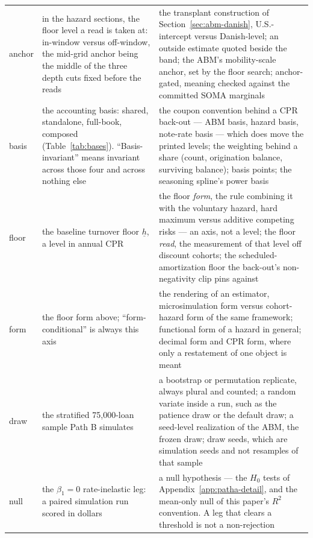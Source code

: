 \documentclass[12pt]{article}
\begin{document}
{\begin{longtable}{@{}p{1.5cm}p{6.2cm}p{6.2cm}@{}}
anchor & in the hazard sections, the floor level a read is taken at: in-window versus off-window, the mid-grid anchor being the middle of the three depth cuts fixed before the reads & the transplant construction of Section~\ref{sec:abm-danish}, U.S.-intercept versus Danish-level; an outside estimate quoted beside the band; the ABM's mobility-scale anchor, set by the floor search; anchor-gated, meaning checked against the committed SOMA marginals \\
basis & the accounting basis: shared, standalone, full-book, composed (Table~\ref{tab:bases}). ``Basis-invariant'' means invariant across those four and across nothing else & the coupon convention behind a CPR back-out --- ABM basis, hazard basis, note-rate basis --- which does move the printed levels; the weighting behind a share (count, origination balance, surviving balance); basis points; the seasoning spline's power basis \\
floor & the baseline turnover floor $\underline{h}$, a level in annual CPR & the floor \emph{form}, the rule combining it with the voluntary hazard, hard maximum versus additive competing risks --- an axis, not a level; the floor \emph{read}, the measurement of that level off discount cohorts; the scheduled-amortization floor the back-out's non-negativity clip pins against \\
form & the floor form above; ``form-conditional'' is always this axis & the rendering of an estimator, microsimulation form versus cohort-hazard form of the same framework; functional form of a hazard in general; decimal form and CPR form, where only a restatement of one object is meant \\
draw & the stratified 75{,}000-loan sample Path B simulates & a bootstrap or permutation replicate, always plural and counted; a random variate inside a run, such as the patience draw or the default draw; a seed-level realization of the ABM, the frozen draw; draw seeds, which are simulation seeds and not resamples of that sample \\
null & the $\beta_1 = 0$ rate-inelastic leg: a paired simulation run scored in dollars & a null hypothesis --- the $H_0$ tests of Appendix~\ref{app:patha-detail}, and the mean-only null of this paper's $R^2$ convention. A leg that clears a threshold is not a non-rejection \\
\bottomrule
\end{longtable}
}

\end{document}

